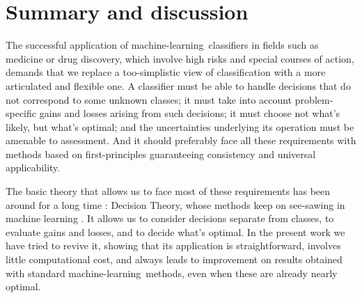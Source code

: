 \documentclass[\ifafour a4paper,12pt,\else a5paper,10pt,\fi%
onecolumn,oneside,article,%
british%
]{memoir}
\theoremstyle{remark}
\theoremstyle{innote}
\newcommand*{\puzzle}{{\fontencoding{U}\fontfamily{fontawesometwo}\selectfont\symbol{225}}}
\newcommand{\mynotez}[1]{{\footnotesize\color{notecolour}\puzzle\ #1}}
\newcommand*{\p}{\mathrm{p}}%
\renewcommand*{\|}[1][]{\nonscript\:#1\vert\nonscript\:\mathopen{}}
\newcommand*{\sect}{\S}%
\newcommand*{\eg}{{e.g.}}
\newcommand*{\cf}{{cf.}}
\newcommand*{\ml}{machine-learning}
\begin{document}


\section{Summary and discussion}
\label{sec:summary_discussion}

The successful application of \ml\ classifiers in fields such as medicine or drug discovery, which involve high risks and special courses of action, demands that we replace a too-simplistic view of classification with a more articulated and flexible one. A classifier must be able to handle decisions that do not correspond to some unknown classes; it must take into account problem-specific gains and losses arising from such decisions; it must choose not what's likely, but what's optimal; and the uncertainties underlying its operation must be amenable to assessment. And it should preferably face all these requirements with methods based on first-principles guaranteeing consistency and universal applicability.

The basic theory that allows us to face most of these requirements has been around for a long time \autocites[at least since][]{luceetal1957}[\cf][\sect~1.2]{russelletal1995_r2022}: Decision Theory, whose methods keep on see-sawing in machine learning \autocites[\eg][]{selfetal1987,elkan2001,drummondetal2005}. It allows us to consider decisions separate from classes, to evaluate gains and losses, and to decide what's optimal. In the present work we have tried to revive it, showing that its application is straightforward, involves little computational cost, and always leads to improvement on results obtained with standard \ml\ methods, even when these are already nearly optimal.
\end{document}
